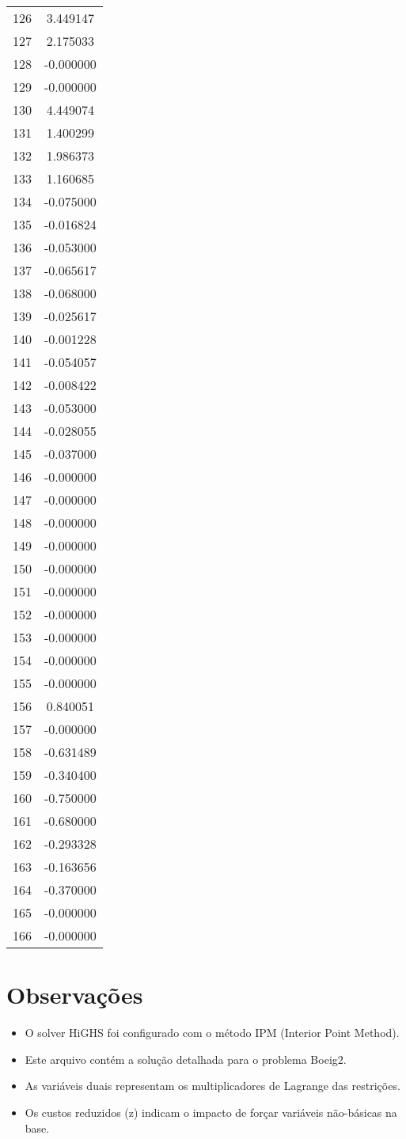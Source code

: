 \documentclass[12pt]{article}
\begin{document}
\begin{longtable}{@{}cc@{}}
126 & 3.449147 \\
127 & 2.175033 \\
128 & -0.000000 \\
129 & -0.000000 \\
130 & 4.449074 \\
131 & 1.400299 \\
132 & 1.986373 \\
133 & 1.160685 \\
134 & -0.075000 \\
135 & -0.016824 \\
136 & -0.053000 \\
137 & -0.065617 \\
138 & -0.068000 \\
139 & -0.025617 \\
140 & -0.001228 \\
141 & -0.054057 \\
142 & -0.008422 \\
143 & -0.053000 \\
144 & -0.028055 \\
145 & -0.037000 \\
146 & -0.000000 \\
147 & -0.000000 \\
148 & -0.000000 \\
149 & -0.000000 \\
150 & -0.000000 \\
151 & -0.000000 \\
152 & -0.000000 \\
153 & -0.000000 \\
154 & -0.000000 \\
155 & -0.000000 \\
156 & 0.840051 \\
157 & -0.000000 \\
158 & -0.631489 \\
159 & -0.340400 \\
160 & -0.750000 \\
161 & -0.680000 \\
162 & -0.293328 \\
163 & -0.163656 \\
164 & -0.370000 \\
165 & -0.000000 \\
166 & -0.000000 \\

\end{longtable}


\section{Observações}

\begin{itemize}
\item O solver HiGHS foi configurado com o método IPM (Interior Point Method).
\item Este arquivo contém a solução detalhada para o problema Boeig2.
\item As variáveis duais representam os multiplicadores de Lagrange das restrições.
\item Os custos reduzidos (z) indicam o impacto de forçar variáveis não-básicas na base.
\end{itemize}
\end{document}
